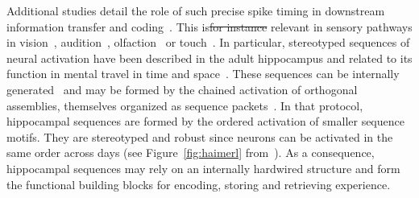 \documentclass[brainsci, %
               review,accept,pdftex,moreauthors %
               ]{Definitions/mdpi}
\providecommand{\DIFadd}[1]{{\protect\color{blue}\uwave{#1}}} %
\providecommand{\DIFdel}[1]{{\protect\color{red}\sout{#1}}}                      %
\providecommand{\DIFaddbegin}{} %
\providecommand{\DIFaddend}{} %
\providecommand{\DIFdelbegin}{} %
\providecommand{\DIFdelend}{} %
\newcommand{\DIFscaledelfig}{0.5}
\newlength{\DIFdelgraphicswidth} %
\newlength{\DIFdelgraphicsheight} %
\newcommand{\DIFaddincludegraphics}[2][]{{\color{blue}\fbox{\DIFOincludegraphics[#1]{#2}}}} %
\newcommand{\DIFdelincludegraphics}[2][]{%
\sbox{\DIFdelgraphicsbox}{\DIFOincludegraphics[#1]{#2}}%
\settoboxwidth{\DIFdelgraphicswidth}{\DIFdelgraphicsbox} %
\settoboxtotalheight{\DIFdelgraphicsheight}{\DIFdelgraphicsbox} %
\scalebox{\DIFscaledelfig}{%
\parbox[b]{\DIFdelgraphicswidth}{\usebox{\DIFdelgraphicsbox}\\[-\baselineskip] \rule{\DIFdelgraphicswidth}{0em}}\llap{\resizebox{\DIFdelgraphicswidth}{\DIFdelgraphicsheight}{%
\setlength{\unitlength}{\DIFdelgraphicswidth}%
\begin{picture}(1,1)%
\thicklines\linethickness{2pt} %
{\color[rgb]{1,0,0}\put(0,0){\framebox(1,1){}}}%
{\color[rgb]{1,0,0}\put(0,0){\line( 1,1){1}}}%
{\color[rgb]{1,0,0}\put(0,1){\line(1,-1){1}}}%
\end{picture}%
}\hspace*{3pt}}} %
} %
\DeclareRobustCommand{\DIFaddbegin}{\DIFOaddbegin \let\includegraphics\DIFaddincludegraphics} %
\DeclareRobustCommand{\DIFaddend}{\DIFOaddend \let\includegraphics\DIFOincludegraphics} %
\DeclareRobustCommand{\DIFdelbegin}{\DIFOdelbegin \let\includegraphics\DIFdelincludegraphics} %
\DeclareRobustCommand{\DIFdelend}{\DIFOaddend \let\includegraphics\DIFOincludegraphics} %
\begin{document}
Additional studies detail the role of such precise spike timing in downstream information transfer and coding~\citep{villette_internally_2015,branco_dendritic_2010,luczak_packet-based_2015}. This is\DIFdelbegin \DIFdel{for instance }\DIFdelend \DIFaddbegin \DIFadd{, for instance, }\DIFaddend relevant in sensory pathways in vision~\citep{meister_concerted_1995}, audition~\citep{decharms_primary_1996}, olfaction~\citep{cleland_construction_2014, kashiwadani_synchronized_1999, rinberg_speed-accuracy_2006} or touch~\citep{johansson_first_2004}.  In particular, stereotyped sequences of neural activation have been described in the adult hippocampus and related to its function in mental travel in time and space~\citep{buzsaki_space_2018}. These sequences can be internally generated~\citep{pastalkova_internally_2008,villette_internally_2015} and may be formed by the chained activation of orthogonal assemblies, themselves organized as sequence packets~\citep{malvache_awake_2016}. In that protocol, hippocampal sequences are formed by the ordered activation of smaller sequence motifs. They are stereotyped and robust since neurons can be activated in the same order across days (see Figure~\ref{fig:haimerl} from~\citep{haimerl_internal_2019}). As a consequence, hippocampal sequences may rely on an internally hardwired structure and form the functional building blocks for encoding, storing and retrieving experience.
%
\DIFdelbegin %
\end{document}
